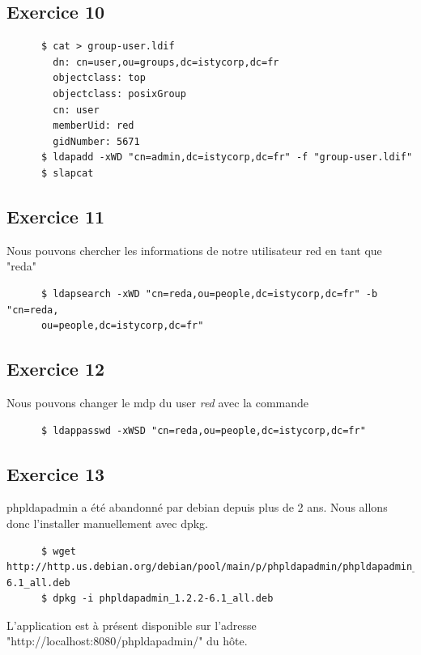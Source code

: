 \documentclass{report}
\begin{document}
\subsection{Exercice 10}
\begin{tcolorbox}
  \begin{verbatim}
      $ cat > group-user.ldif
        dn: cn=user,ou=groups,dc=istycorp,dc=fr
        objectclass: top
        objectclass: posixGroup
        cn: user
        memberUid: red
        gidNumber: 5671
      $ ldapadd -xWD "cn=admin,dc=istycorp,dc=fr" -f "group-user.ldif"
      $ slapcat
  \end{verbatim}
\end{tcolorbox}
\subsection{Exercice 11}
Nous pouvons chercher les informations de notre utilisateur red en tant que "reda"
\begin{tcolorbox}
  \begin{verbatim}
      $ ldapsearch -xWD "cn=reda,ou=people,dc=istycorp,dc=fr" -b "cn=reda,
      ou=people,dc=istycorp,dc=fr"
  \end{verbatim}
\end{tcolorbox}
\subsection{Exercice 12}
Nous pouvons changer le mdp du user \textit{red} avec la commande
\begin{tcolorbox}
  \begin{verbatim}
      $ ldappasswd -xWSD "cn=reda,ou=people,dc=istycorp,dc=fr"
  \end{verbatim}
\end{tcolorbox}
\subsection{Exercice 13}
phpldapadmin a été abandonné par debian depuis plus de 2 ans. Nous allons donc l'installer
manuellement avec dpkg.
\begin{tcolorbox}
  \begin{verbatim}
      $ wget http://http.us.debian.org/debian/pool/main/p/phpldapadmin/phpldapadmin_1.2.2-6.1_all.deb
      $ dpkg -i phpldapadmin_1.2.2-6.1_all.deb
  \end{verbatim}
\end{tcolorbox}
L'application est à présent disponible sur l'adresse "http://localhost:8080/phpldapadmin/" du hôte.
\end{document}
